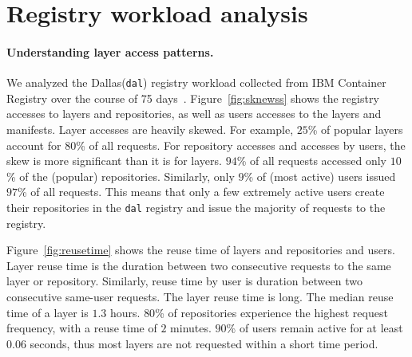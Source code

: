 \section{Registry workload analysis}


\paragraph{Understanding layer access patterns.}
We analyzed the Dallas(\texttt{dal}) registry workload collected from IBM Container Registry over the course of 75 days~\cite{dockerworkload}. 
Figure~\ref{fig:sknewss} shows the registry accesses to layers and repositories, as well as users accesses to the layers and manifests.
Layer accesses are heavily skewed. For example, $25$\% of popular layers account for $80$\% of all requests. 
For repository accesses and accesses by users, the skew is more significant than it is for layers. %
$94$\% of all requests accessed only $10$\% of the (popular) repositories. Similarly, only $9$\% of (most active) users issued $97$\% of all requests. 
This means that only a few extremely active users create their repositories in the \texttt{dal} registry and issue the majority of requests to the registry.

Figure~\ref{fig:reusetime} shows the reuse time of layers and repositories and users.
Layer reuse time is the duration between two consecutive requests to the same layer or repository. Similarly,
reuse time by user is duration between two consecutive same-user requests.
The layer reuse time is long.
The median reuse time of a layer is $1.3$ hours. $80$\% of repositories experience the highest request frequency, with a reuse time of $2$ minutes. 
$90$\% of users remain active for at least $0.06$ seconds, thus most layers are not requested within a short time period.

